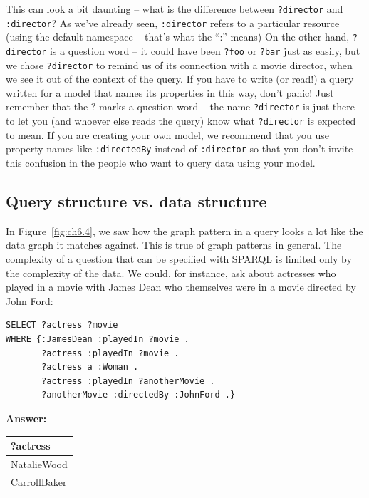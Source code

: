 This can look a bit daunting -- what is the difference between \texttt{?director}
and \texttt{:director}? As we've already seen, \texttt{:director} refers to a particular
resource (using the default namespace -- that's what the ``:'' means) On
the other hand, \texttt{?director} is a question word -- it could have been \texttt{?foo}
or \texttt{?bar} just as easily, but we chose \texttt{?director} to remind us of its
connection with a movie director, when we see it out of the context of
the query. If you have to write (or read!) a query written for a model
that names its properties in this way, don't panic! Just remember that
the ? marks a question word -- the name \texttt{?director} is just there to let
you (and whoever else reads the query) know what \texttt{?director} is expected
to mean. If you are creating your own model, we recommend that you use
property names like \texttt{:directedBy} instead of \texttt{:director} so that you don't
invite this confusion in the people who want to query data using your
model.

\subsection{Query structure vs. data structure}

In Figure~\ref{fig:ch6.4}, we saw how the graph pattern in a query looks a lot like
the data graph it matches against. This is true of graph patterns in
general. The complexity of a question that can be specified with SPARQL
is limited only by the complexity of the data. We could, for instance,
ask about actresses who played in a movie with James Dean who themselves
were in a movie directed by John Ford:

\begin{lstlisting}
SELECT ?actress ?movie
WHERE {:JamesDean :playedIn ?movie .
       ?actress :playedIn ?movie .
       ?actress a :Woman .
       ?actress :playedIn ?anotherMovie .
       ?anotherMovie :directedBy :JohnFord .}
\end{lstlisting}

\textbf{\textbf{Answer:}}

\begin{tabular}{|l|}
\hline
?actress\\
\hline
NatalieWood\\
CarrollBaker\\
\hline
\end{tabular}

